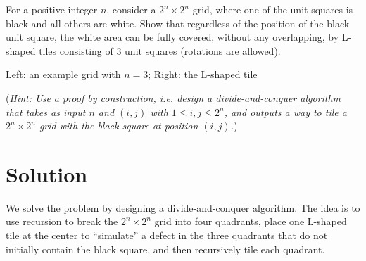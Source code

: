 \documentclass[11pt]{article}
\begin{document}
    \begin{tcolorbox}[title={Problem 3 (Grid Tiling, 35 pts)}]
        For a positive integer $n$, consider a $2^n \times 2^n$ grid, where one of the unit squares is black and all others are white. Show that regardless of the position of the black unit square, the white area can be fully covered, without any overlapping, by L-shaped tiles consisting of $3$ unit squares (rotations are allowed).
        
        \bigskip
        
        {
        \centering
        
        Left: an example grid with $n=3$; Right: the L-shaped tile
        
        }

        \bigskip
        
        (\emph{Hint: Use a proof by construction, i.e. design a divide-and-conquer algorithm that takes as input $n$ and $(i,j)$ with $1\leq i,j \leq 2^n$, and outputs a way to tile a $2^n\times 2^n$ grid with the black square at position $(i,j)$.}) 
        \medskip

             
    \end{tcolorbox}
    \section*{Solution}
    We solve the problem by designing a divide-and-conquer algorithm. The idea is to use recursion to break the \( 2^n \times 2^n \) grid into four quadrants, place one L-shaped tile at the center to “simulate” a defect in the three quadrants that do not initially contain the black square, and then recursively tile each quadrant.
    
    \bigskip
    
\end{document}
